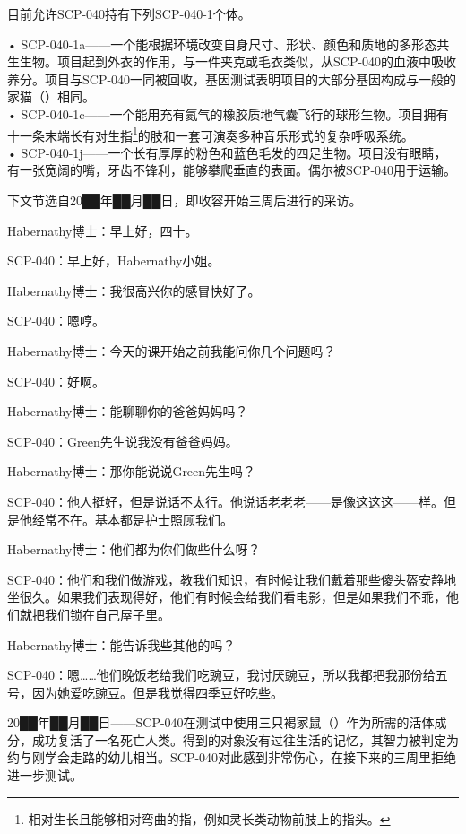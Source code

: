 目前允许SCP-040持有下列SCP-040-1个体。

• SCP-040-1a——一个能根据环境改变自身尺寸、形状、颜色和质地的多形态共生生物。项目起到外衣的作用，与一件夹克或毛衣类似，从SCP-040的血液中吸收养分。项目与SCP-040一同被回收，基因测试表明项目的大部分基因构成与一般的家猫（）相同。\\
• SCP-040-1c——一个能用充有氦气的橡胶质地气囊飞行的球形生物。项目拥有十一条末端长有对生指\footnote{相对生长且能够相对弯曲的指，例如灵长类动物前肢上的指头。}的肢和一套可演奏多种音乐形式的复杂呼吸系统。\\
• SCP-040-1j——一个长有厚厚的粉色和蓝色毛发的四足生物。项目没有眼睛，有一张宽阔的嘴，牙齿不锋利，能够攀爬垂直的表面。偶尔被SCP-040用于运输。


下文节选自20██年██月██日，即收容开始三周后进行的采访。

\begin{scpbox}

Habernathy博士：早上好，四十。

SCP-040：早上好，Habernathy小姐。

Habernathy博士：我很高兴你的感冒快好了。

SCP-040：嗯哼。

Habernathy博士：今天的课开始之前我能问你几个问题吗？

SCP-040：好啊。

Habernathy博士：能聊聊你的爸爸妈妈吗？

SCP-040：Green先生说我没有爸爸妈妈。

Habernathy博士：那你能说说Green先生吗？

SCP-040：他人挺好，但是说话不太行。他说话老老老——是像这这这——样。但是他经常不在。基本都是护士照顾我们。

Habernathy博士：他们都为你们做些什么呀？

SCP-040：他们和我们做游戏，教我们知识，有时候让我们戴着那些傻头盔安静地坐很久。如果我们表现得好，他们有时候会给我们看电影，但是如果我们不乖，他们就把我们锁在自己屋子里。

Habernathy博士：能告诉我些其他的吗？

SCP-040：嗯……他们晚饭老给我们吃豌豆，我讨厌豌豆，所以我都把我那份给五号，因为她爱吃豌豆。但是我觉得四季豆好吃些。

\end{scpbox}

20██年██月██日——SCP-040在测试中使用三只褐家鼠（）作为所需的活体成分，成功复活了一名死亡人类。得到的对象没有过往生活的记忆，其智力被判定为约与刚学会走路的幼儿相当。SCP-040对此感到非常伤心，在接下来的三周里拒绝进一步测试。

\newpage

